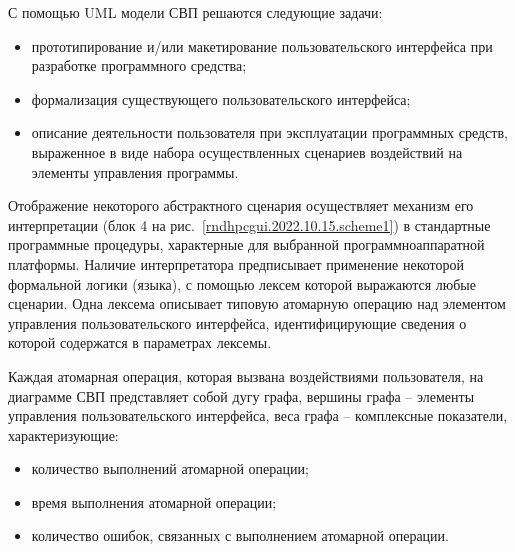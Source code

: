 С помощью UML модели СВП решаются следующие задачи: 
\begin{itemize}
	\item прототипирование и/или макетирование пользовательского интерфейса при разработке программного средства;
	\item формализация существующего пользовательского интерфейса;
	\item описание деятельности пользователя при эксплуатации программных средств, выраженное в виде набора осуществленных сценариев воздействий на элементы управления программы.
\end{itemize}

Отображение некоторого абстрактного сценария осуществляет механизм его интерпретации (блок 4 на рис.~\ref{rndhpcgui.2022.10.15.scheme1}) в стандартные программные процедуры, характерные для выбранной программноаппаратной платформы. Наличие интерпретатора предписывает применение некоторой формальной логики (языка), с помощью лексем которой выражаются любые сценарии. Одна лексема описывает типовую атомарную операцию над элементом управления пользовательского интерфейса, идентифицирующие сведения о которой содержатся в параметрах лексемы.
	
Каждая атомарная операция, которая вызвана воздействиями пользователя, на диаграмме СВП представляет собой дугу графа, вершины графа -- элементы управления пользовательского интерфейса, веса графа -- комплексные показатели, характеризующие:
\begin{itemize}
	\item количество выполнений атомарной операции; 
	\item время выполнения атомарной операции;
	\item количество ошибок, связанных с выполнением атомарной операции.
\end{itemize}
\noteattributes{}


